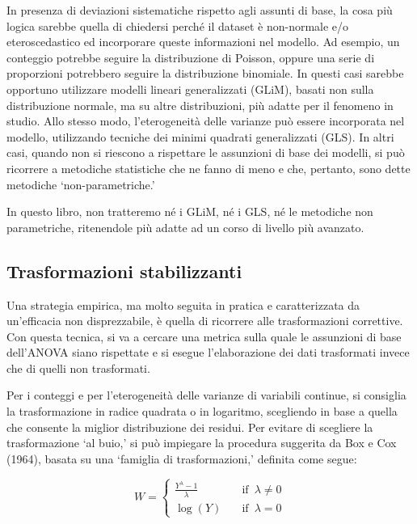 \documentclass[a4paper,12pt,oneside]{book}
\begin{document}
In presenza di deviazioni sistematiche rispetto agli assunti di base, la cosa più logica sarebbe quella di chiedersi perché il dataset è non-normale e/o eteroscedastico ed incorporare queste informazioni nel modello. Ad esempio, un conteggio potrebbe seguire la distribuzione di Poisson, oppure una serie di proporzioni potrebbero seguire la distribuzione binomiale. In questi casi sarebbe opportuno utilizzare modelli lineari generalizzati (GLiM), basati non sulla distribuzione normale, ma su altre distribuzioni, più adatte per il fenomeno in studio. Allo stesso modo, l'eterogeneità delle varianze può essere incorporata nel modello, utilizzando tecniche dei minimi quadrati generalizzati (GLS). In altri casi, quando non si riescono a rispettare le assunzioni di base dei modelli, si può ricorrere a metodiche statistiche che ne fanno di meno e che, pertanto, sono dette metodiche `non-parametriche.'

In questo libro, non tratteremo né i GLiM, né i GLS, né le metodiche non parametriche, ritenendole più adatte ad un corso di livello più avanzato.

\hypertarget{trasformazioni-stabilizzanti}{%
\subsection{Trasformazioni stabilizzanti}\label{trasformazioni-stabilizzanti}}

Una strategia empirica, ma molto seguita in pratica e caratterizzata da un'efficacia non disprezzabile, è quella di ricorrere alle trasformazioni correttive. Con questa tecnica, si va a cercare una metrica sulla quale le assunzioni di base dell'ANOVA siano rispettate e si esegue l'elaborazione dei dati trasformati invece che di quelli non trasformati.

Per i conteggi e per l'eterogeneità delle varianze di variabili continue, si consiglia la trasformazione in radice quadrata o in logaritmo, scegliendo in base a quella che consente la miglior distribuzione dei residui. Per evitare di scegliere la trasformazione `al buio,' si può impiegare la procedura suggerita da Box e Cox (1964), basata su una `famiglia di trasformazioni,' definita come segue:

\[ W = \left\{ \begin{array}{ll}
\frac{Y^\lambda - 1}{\lambda} & \quad \textrm{if} \,\,\, \lambda \neq 0 \\
\log(Y) & \quad \textrm{if} \,\,\, \lambda = 0
\end{array} \right.\]
\end{document}
